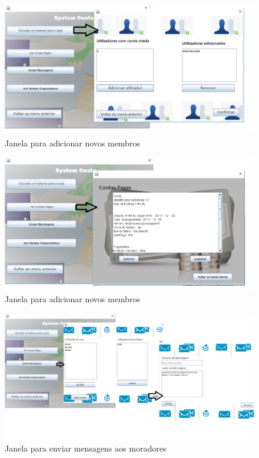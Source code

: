 \begin{figure}[h!]
	\centering
	\includegraphics[scale=0.6]{imagens/interface/botaoadicionamorador}  
	\caption{Janela para adicionar novos membros}  
\end{figure}

\begin{figure}[h!]
	\centering
	\includegraphics[scale=0.6]{imagens/interface/adminvercontaspagas}  
	\caption{Janela para adicionar novos membros}  
\end{figure}

\begin{figure}[h!]
	\centering
	\includegraphics[scale=0.5]{imagens/interface/enviarmensagemadmin}  
	\caption{Janela para enviar mensagens aos moradores}  
\end{figure}

